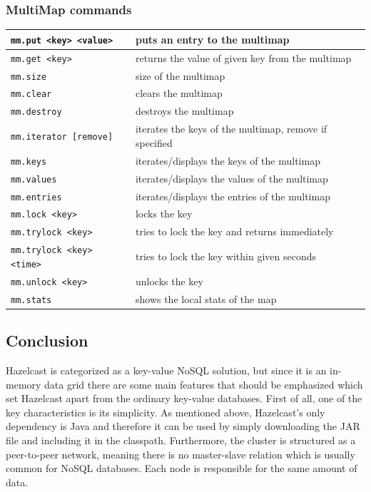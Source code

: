 \subsubsection*{MultiMap commands}
\begin{tabular}{|p{}|p{}|}
    \hline
    \texttt{mm.put <key> <value>} & puts an entry to the multimap\\\hline
    \texttt{mm.get <key>} & returns the value of given key from the multimap\\\hline
    \texttt{mm.size} & size of the multimap\\\hline
    \texttt{mm.clear} & clears the multimap\\\hline
    \texttt{mm.destroy} & destroys the multimap\\\hline
    \texttt{mm.iterator [remove]} & iterates the keys of the multimap, remove if specified\\\hline
    \texttt{mm.keys} & iterates/displays the keys of the multimap\\\hline
    \texttt{mm.values} & iterates/displays the values of the multimap\\\hline
    \texttt{mm.entries} & iterates/displays the entries of the multimap\\\hline
    \texttt{mm.lock <key>} & locks the key\\\hline
    \texttt{mm.trylock <key>} & tries to lock the key and returns immediately\\\hline
    \texttt{mm.trylock <key> <time>} & tries to lock the key within given seconds\\\hline
    \texttt{mm.unlock <key>} & unlocks the key\\\hline
    \texttt{mm.stats} & shows the local stats of the map\\\hline    
\end{tabular}

\subsection{Conclusion}

Hazelcast is categorized as a key-value NoSQL solution, but since it is an in-memory data grid there are some main features that should be emphasized which set Hazelcast apart from the ordinary key-value databases.
First of all, one of the key characteristics is its simplicity. As mentioned above, Hazelcast’s only dependency is Java and therefore it can be used by simply downloading the JAR file and including it in the classpath.
Furthermore, the cluster is structured as a peer-to-peer network, meaning there is no master-slave relation which is usually common for NoSQL databases. Each node is responsible for the same amount of data.

